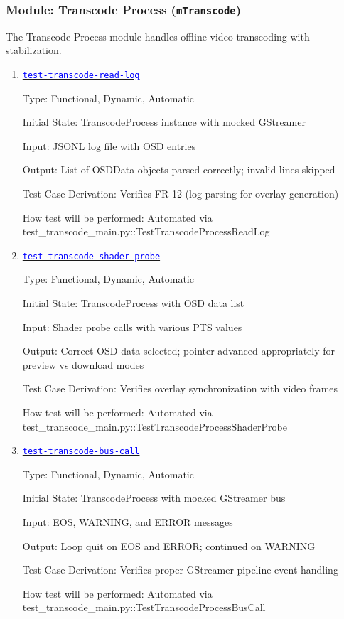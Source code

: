 \documentclass[12pt, titlepage]{article}
\newcommand{\mref}[1]{\texttt{#1}}
\newcommand{\tid}[1]{\hyperlink{tid:#1}{\textcolor{blue}{\texttt{#1}}}}
\begin{document}
\subsubsection{Module: Transcode Process (\mref{mTranscode})}

The Transcode Process module handles offline video transcoding with
stabilization.

\begin{enumerate}

  \item{\tid{test-transcode-read-log}\\}

        Type: Functional, Dynamic, Automatic

        Initial State: TranscodeProcess instance with mocked GStreamer

        Input: JSONL log file with OSD entries

        Output: List of OSDData objects parsed correctly; invalid lines skipped

        Test Case Derivation: Verifies FR-12 (log parsing for overlay generation)

        How test will be performed: Automated via
        test\_transcode\_main.py::TestTranscodeProcessReadLog

  \item{\tid{test-transcode-shader-probe}\\}

        Type: Functional, Dynamic, Automatic

        Initial State: TranscodeProcess with OSD data list

        Input: Shader probe calls with various PTS values

        Output: Correct OSD data selected; pointer advanced appropriately for preview
        vs download modes

        Test Case Derivation: Verifies overlay synchronization with video frames

        How test will be performed: Automated via
        test\_transcode\_main.py::TestTranscodeProcessShaderProbe

  \item{\tid{test-transcode-bus-call}\\}

        Type: Functional, Dynamic, Automatic

        Initial State: TranscodeProcess with mocked GStreamer bus

        Input: EOS, WARNING, and ERROR messages

        Output: Loop quit on EOS and ERROR; continued on WARNING

        Test Case Derivation: Verifies proper GStreamer pipeline event handling

        How test will be performed: Automated via
        test\_transcode\_main.py::TestTranscodeProcessBusCall

\end{enumerate}
\end{document}
